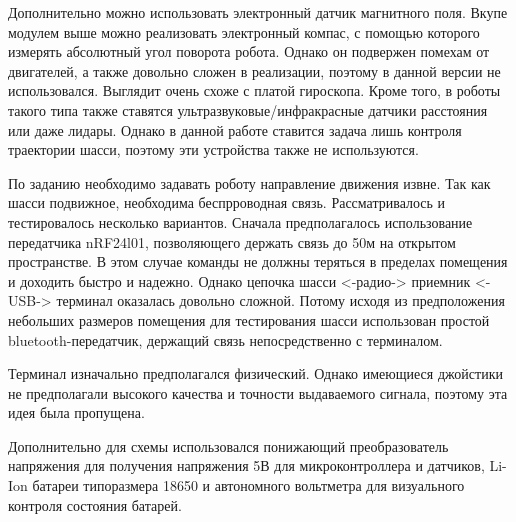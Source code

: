 \documentclass[14pt,a4paper,russian]{scrartcl}
\begin{document}
Дополнительно можно использовать электронный датчик магнитного поля.
Вкупе модулем выше можно реализовать электронный компас, с помощью которого
измерять абсолютный угол поворота робота. Однако он подвержен помехам от 
двигателей, а также довольно сложен в реализации, поэтому в данной версии
не использовался. Выглядит очень схоже с платой гироскопа. Кроме того,
в роботы такого типа также ставятся ультразвуковые/инфракрасные датчики расстояния
или даже лидары. Однако в данной работе ставится задача лишь контроля
траектории шасси, поэтому эти устройства также не используются.

По заданию необходимо задавать роботу направление движения извне. Так как
шасси подвижное, необходима беспрроводная связь. Рассматривалось
и тестировалось несколько вариантов. Сначала предполагалось использование 
передатчика nRF24l01, позволяющего держать связь до 50м на открытом пространстве.
В этом случае команды не должны теряться в пределах помещения и доходить
быстро и надежно. Однако цепочка шасси <-радио-> приемник <-USB-> терминал
оказалась довольно сложной. Потому исходя из предположения небольших
размеров помещения для тестирования шасси использован простой bluetooth-передатчик,
держащий связь непосредственно с терминалом.

Терминал изначально предполагался физический. Однако имеющиеся джойстики
не предполагали высокого качества и точности выдаваемого сигнала, поэтому
эта идея была пропущена.

Дополнительно для схемы использовался понижающий преобразователь
напряжения для получения напряжения 5В для микроконтроллера и датчиков, 
Li-Ion батареи типоразмера 18650 и автономного вольтметра для 
визуального контроля состояния батарей.
\end{document}
